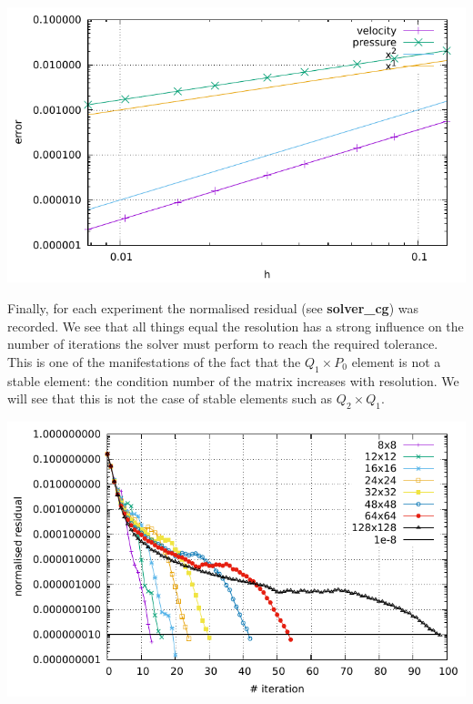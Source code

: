 \begin{center}
\includegraphics[width=15cm]{python_codes/fieldstone_15/images/errors.pdf}
\end{center}

Finally, for each experiment the normalised residual (see {\bf solver\_cg}) was recorded. We see that 
all things equal the resolution has a strong influence on the number of iterations the solver must
perform to reach the required tolerance. This is one of the manifestations of the fact that the 
$Q_1 \times P_0$ element is not a stable element: the condition number of the matrix increases with 
resolution. We will see that this is not the case of stable elements such as $Q_2\times Q_1$.

\begin{center}
\includegraphics[width=15cm]{python_codes/fieldstone_15/images/residual.pdf}
\end{center}

